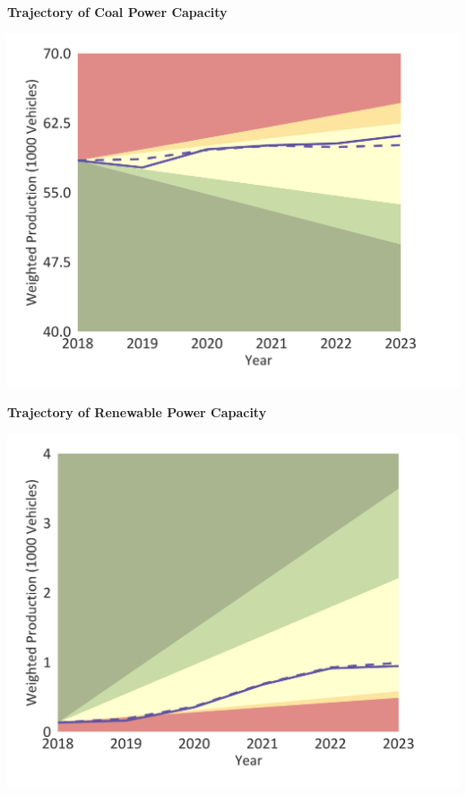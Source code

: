 \documentclass[10pt,table,a4]{article}\usepackage[]{graphicx}\usepackage[]{color}
\begin{document}
		\begin{minipage}[t]{.49\linewidth}
			\textbf{Trajectory of Coal Power Capacity }
		
			\includegraphics[trim = {0 0cm 0 0},width=1\linewidth]{CAFigures/Fig14}
			
			\textbf{Trajectory of Renewable Power Capacity }

			\includegraphics[trim = {0 0cm 0 0},width=.99\linewidth]{CAFigures/Fig15}
		\end{minipage}	
		\hspace{.02\linewidth}
\end{document}
